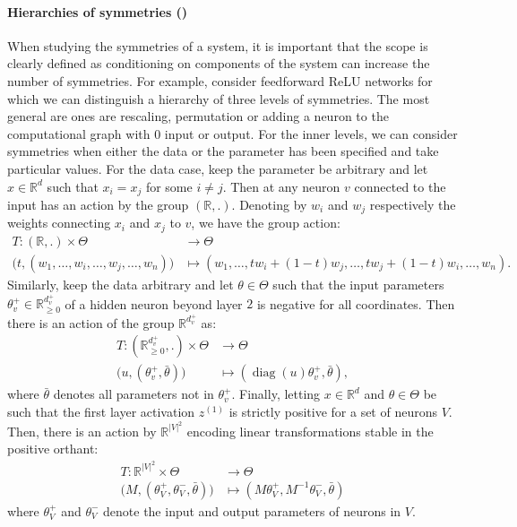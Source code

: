 \paragraph{Hierarchies of symmetries ()}
When studying the symmetries of a system, it is important that the scope is clearly defined as conditioning on components of the system can increase the number of symmetries.
For example, consider feedforward ReLU networks for which we can distinguish a hierarchy of three levels of symmetries.
The most general are ones are rescaling, permutation or adding a neuron to the computational graph with $0$ input or output.
For the inner levels, we can consider symmetries when either the data or the parameter has been specified and take particular values.
For the data case, keep the parameter be arbitrary and let $x\in \mathbb R^d$ such that $x_i=x_j$ for some $i\neq j$.
Then at any neuron $v$ connected to the input has an action by the group $(\mathbb R, .)$.
Denoting by $w_i$ and $w_j$ respectively the weights connecting $x_i$ and $x_j$ to $v$, we have the group action:
\begin{align*}
    T: (\mathbb R, .)\times \Theta&\to\Theta\\
        \big (t, (w_1, \dots, w_i, \dots , w_j, \dots, w_n) \big )& \mapsto (w_1, \dots, tw_i+(1-t)w_j, \dots , tw_j+(1-t)w_i, \dots, w_n).
\end{align*}
Similarly, keep the data arbitrary and let $\theta\in \Theta$ such that the input parameters $\theta_v^+\in \mathbb R^{d_v^+}_{\geq0}$ of a hidden neuron beyond layer $2$ is negative for all coordinates.
Then there is an action of the group $\mathbb R^{d_v^+}$ as:
\begin{align*}
    T: (\mathbb R^{d_v^+}_{\geq0}, .)\times \Theta&\to\Theta\\
        \big (u, (\theta_v^+, \bar\theta) \big )& \mapsto (\operatorname{diag}(u)\theta_v^+, \bar\theta),
\end{align*}
where $\bar \theta$ denotes all parameters not in $\theta_v^+$.
Finally, letting $x\in \mathbb R^d$ and $\theta\in \Theta$ be such that the first layer activation $z^{(1)}$ is strictly positive for a set of neurons $V$.
Then, there is an action by $\mathbb R^{|V|^2}$ encoding linear transformations stable in the positive orthant:
\begin{align*}
    T: \mathbb R^{|V|^2} \times  \Theta &\to \Theta\\
    \big (M,(\theta_V^+, \theta_V^-, \bar \theta)\big ) &\mapsto (M\theta_V^+, M^{-1}\theta_V^-, \bar \theta) 
\end{align*}
where $\theta_V^+$ and $\theta_V^-$ denote the input and output parameters of neurons in $V$.

